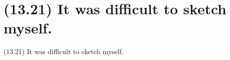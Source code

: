 \documentclass{article}
\begin{document}
\clearpage

%
%

\section*{(13.21) It was difficult to sketch myself.}

\bigbreak
\begin{enumerate*}
\item[(13.21)] It was difficult to sketch myself.
\end{enumerate*}
\bigbreak
\end{document}
